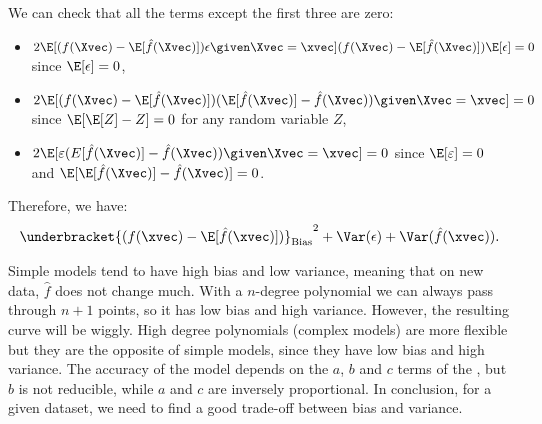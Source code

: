 We can check that all the terms except the first three are zero:
\begin{itemize}
    \item $2\E[(f(\Xvec) - \E[\hat{f}(\Xvec)])\epsilon\given \Xvec = \xvec] (f(\Xvec) - \E[\hat{f}(\Xvec)])\E[\epsilon] = 0$ since $\E[\epsilon] = 0$,
    \item $2\E[(f(\Xvec) - \E[\hat{f}(\Xvec)])(\E[\hat{f}(\Xvec)] - \hat{f}(\Xvec))\given \Xvec = \xvec] = 0$ since $\E[\E[Z] - Z] = 0$ for any random variable $Z$,
    \item $2\E[\varepsilon(E[\hat{f}(\Xvec)] - \hat{f}(\Xvec))\given \Xvec = \xvec] = 0$ since $\E[\varepsilon] = 0$ and $\E[\E[\hat{f}(\Xvec)] - \hat{f}(\Xvec)] = 0$.
\end{itemize}
Therefore, we have:
\begin{equation}
    {\underbracket{(f(\xvec) - \E[\hat{f}(\xvec)])}_{\text{Bias}}}^2 + \Var(\epsilon) + \Var(\hat{f}(\xvec)).
\end{equation}

Simple models tend to have high bias and low variance, meaning that on new data, $\hat{f}$ does not change much. With a $n$-degree polynomial we can always pass through $n+1$ points, so it has low bias and high variance. However, the resulting curve will be wiggly. High degree polynomials (complex models) are more flexible but they are the opposite of simple models, since they have low bias and high variance. The accuracy of the model depends on the $a$, $b$ and $c$ terms of the , but $b$ is not reducible, while $a$ and $c$ are inversely proportional. In conclusion, for a given dataset, we need to find a good trade-off between bias and variance.